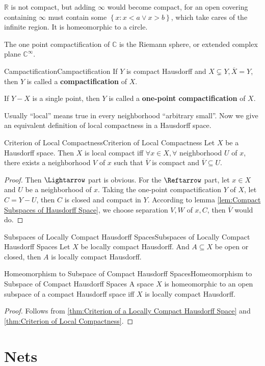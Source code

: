 \documentclass[../main.tex]{subfiles}
\begin{document}
\begin{remark}
$\mathbb{R}$ is not compact, but adding $\infty $ would become compact, for an open covering containing $\infty $ must contain some $\left\{ x:x<a\lor x>b \right\}$, which take cares of the infinite region. It is homeomorphic to a circle.

The one point compactification of $\mathbb{C}$ is the Riemann sphere, or extended complex plane $\mathbb{C}^{\infty }$.
\end{remark}

\begin{definition}{Campactification}{Campactification}
	If $Y$ is compact Hausdorff and $X \subsetneq Y, \overline{X}=Y$, then $Y$ is called a \textbf{compactification} of $X$. 

	If $Y-X$ is a single point, then $Y$ is called a \textbf{one-point compactification} of $X$.
\end{definition}

Usually ``local'' means true in every neighborhood ``arbitrary small''. Now we give an equivalent definition of local compactness in a Hausdorff space.

\begin{theorem}{Criterion of Local Compactness}{Criterion of Local Compactness}
	Let $X$ be a Hausdorff space. Then $X$ is local compact iff $\forall x\in X,\forall $ neighborhood $U$ of $x$, there exists a neighborhood $V$ of $x$ such that $\overline{V}$ is compact and $\overline{V} \subseteq U$.
\end{theorem}
\begin{proof}
	Then $\Lightarrow$ part is obvious. For the $\Reftarrow$ part, let $x\in X$ and $U$ be a neighborhood of $x$. Taking the one-point compactification $Y$ of $X$, let $C=Y-U$, then $C$ is closed and compact in $Y$. According to lemma \ref{lem:Compact Subspaces of Hausdorff Space}, we choose separation $V,W$ of $x,C$, then $\overline{V}$ would do. 
\end{proof}

\begin{corollary}{Subspaces of Locally Compact Hausdorff Spaces}{Subspaces of Locally Compact Hausdorff Spaces}
Let $X$ be locally compact Hausdorff. And $A \subseteq X$ be open or closed, then $A$ is locally compact Hausdorff.
\end{corollary}

\begin{corollary}{Homeomorphism to Subspace of Compact Hausdorff Spaces}{Homeomorphism to Subspace of Compact Hausdorff Spaces}
A space $X$ is homeomorphic to an open subspace of a compact Hausdorff space iff $X$ is locally compact Hausdorff.
\end{corollary}
\begin{proof}
	Follows from \ref{thm:Criterion of a Locally Compact Hausdorff Space} and \ref{thm:Criterion of Local Compactness}.
\end{proof}

\section{Nets}
\end{document}
